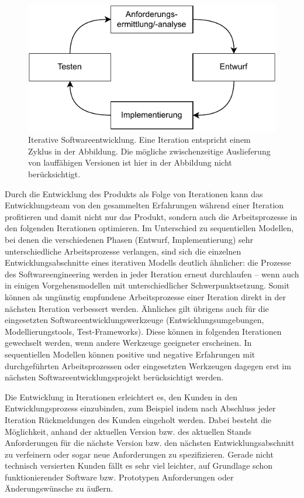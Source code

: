 \begin{figure}[h!]
	\centering
	\includegraphics[scale=1.0]{Bilder/Kapitel-2/Abb-2-9.pdf}
	\caption[Iterative Softwareentwicklung]{Iterative Softwareentwicklung. Eine Iteration entspricht einem Zyklus in der Abbildung. Die mögliche zwischenzeitige Auslieferung von lauffähigen Versionen ist hier in der Abbildung nicht berücksichtigt.}
	\label{fig:iterative_softwareentwicklung}
\end{figure}

Durch die Entwicklung des Produkts als Folge von Iterationen kann das Entwicklungsteam von den gesammelten Erfahrungen während einer Iteration profitieren und damit nicht nur das Produkt, sondern auch die Arbeitsprozesse in den folgenden Iterationen optimieren. Im Unterschied zu sequentiellen Modellen, bei \mbox{denen} die verschiedenen Phasen (\zb Entwurf, Implementierung) sehr unter\-schied\-liche Arbeitsprozesse verlangen, sind sich die einzelnen Entwicklungsabschnitte eines iterativen Modells deutlich ähnlicher: die Prozesse des Softwareengineering werden in jeder Iteration erneut durchlaufen – wenn auch in einigen Vorgehensmodellen mit unterschiedlicher Schwerpunktsetzung. Somit können als ungünstig empfundene Arbeitsprozesse einer Iteration direkt in der nächsten Iteration verbessert werden. Ähnliches gilt übrigens auch für die eingesetzten Softwareentwicklungswerkzeuge  (\zb Entwicklungsumgebungen, Modellierungstools, Test-Frameworks). %
Diese können in folgenden Iterationen gewechselt werden, wenn andere Werkzeuge geeigneter erscheinen. In sequentiellen Modellen können positive und negative Erfahrungen mit durchgeführten Arbeitsprozessen oder eingesetzten Werkzeugen dagegen erst im nächsten Softwareentwicklungsprojekt berücksichtigt werden.

Die Entwicklung in Iterationen erleichtert es, den Kunden in den Entwicklungsprozess einzubinden, zum Beispiel indem nach Abschluss jeder Iteration Rückmeldungen des Kunden eingeholt werden. Dabei besteht die Möglichkeit, anhand der aktuellen Version bzw. des aktuellen Stands Anforderungen für die nächste Version bzw. den nächsten Entwicklungsabschnitt zu verfeinern oder sogar neue Anforderungen zu spezifizieren. Gerade nicht technisch versierten Kunden fällt es sehr viel leichter, auf Grundlage schon funktionierender Software bzw. Prototypen Anforderungen oder Änderungswünsche zu äußern.

